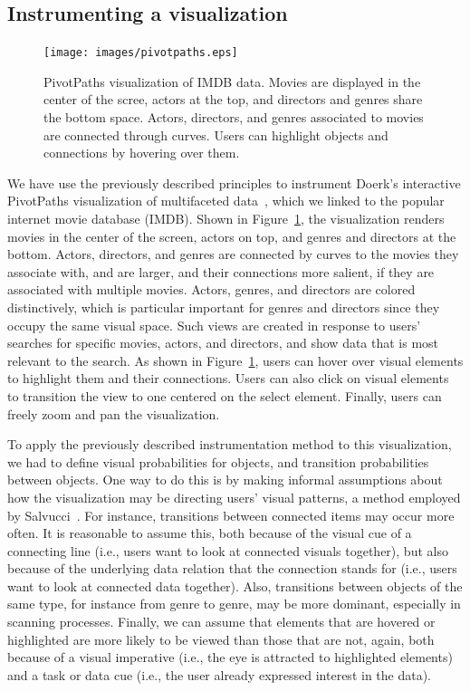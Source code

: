 \subsection{Instrumenting a visualization}

\begin{figure}[htb]
  \centering
  \texttt{[image: images/pivotpaths.eps]}
  \caption{PivotPaths visualization of IMDB data. Movies are displayed in the center of the scree, actors at the top, and directors and genres share the bottom space. Actors, directors, and genres associated to movies are connected through curves. Users can highlight objects and connections by hovering over them.}
	\label{fig:pivotpaths}
\end{figure}
We have use the previously described principles to instrument Doerk's interactive PivotPaths visualization of multifaceted data~\cite{dork2012pivotpaths}, which we linked to the popular internet movie database (IMDB). Shown in Figure~\ref{fig:pivotpaths}, the visualization renders movies in the center of the screen, actors on top, and genres and directors at the bottom. Actors, directors, and genres are connected by curves to the movies they associate with, and are larger, and their connections more salient, if they are associated with multiple movies. Actors, genres, and directors are colored distinctively, which is particular important for genres and directors since they occupy the same visual space. Such views are created in response to users' searches for specific movies, actors, and directors, and show data that is most relevant to the search. As shown in Figure~\ref{fig:pivotpaths}, users can hover over visual elements to highlight them and their connections. Users can also click on visual elements to transition the view to one centered on the select element. Finally, users can freely zoom and pan the visualization. 

To apply the previously described instrumentation method to this visualization, we had to define visual probabilities for objects, and transition probabilities between objects. One way to do this is by making informal assumptions about how the visualization may be directing users' visual patterns, a method employed by Salvucci~\cite{salvucci2000intelligent}. For instance, transitions between connected items may occur more often. It is reasonable to assume this, both because of the visual cue of a connecting line (i.e., users want to look at connected visuals together), but also because of the underlying data relation that the connection stands for (i.e., users want to look at connected data together). Also, transitions between objects of the same type, for instance from genre to genre, may be more dominant, especially in scanning processes. Finally, we can assume that elements that are hovered or highlighted are more likely to be viewed than those that are not, again, both because of a visual imperative (i.e., the eye is attracted to highlighted elements) and a task or data cue (i.e., the user already expressed interest in the data).


